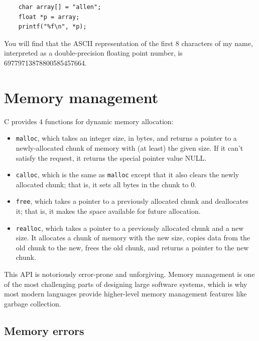 \documentclass[12pt]{book}
\begin{document}
{\begin{verbatim}
    char array[] = "allen";
    float *p = array;
    printf("%f\n", *p);
\end{verbatim}

You will find that the ASCII representation of the first 8 characters
of my name, interpreted as a double-precision floating point number,
is 69779713878800585457664.



\chapter{Memory management}

C provides 4 functions for dynamic memory allocation:

\begin{itemize}

\item {\tt malloc}, which takes an integer size, in bytes, and returns
a pointer to a newly-allocated chunk of memory with (at least) the
given size.  If it can't satisfy the request, it returns
the special pointer value NULL.

\item {\tt calloc}, which is the same as {\tt malloc} except that
it also clears the newly allocated chunk; that
is, it sets all bytes in the chunk to 0.

\item {\tt free}, which takes a pointer to a previously allocated
chunk and deallocates it; that is, it makes the space available for
future allocation.

\item {\tt realloc}, which takes a pointer to a previously allocated
chunk and a new size.  It allocates a chunk of memory with the new
size, copies data from the old chunk to the new, frees the old chunk,
and returns a pointer to the new chunk.

\end{itemize}

This API is notoriously error-prone and unforgiving.  Memory management
is one of the most challenging parts of designing large software systems,
which is why most modern languages provide higher-level memory
management features like garbage collection.


\section{Memory errors}

}
\end{document}
